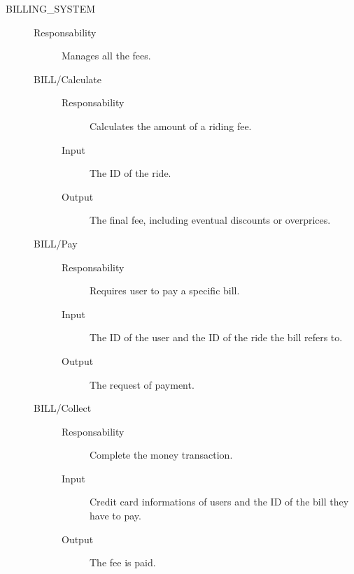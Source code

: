 \documentclass[11pt]{article} %
\begin{document}
\begin{description}
	\item[BILLING\_SYSTEM] \hfill
	\begin{description}
		\item[Responsability] Manages all the fees.
	\item[BILL/Calculate] \hfill
		\begin{description}
			\item[Responsability] Calculates the amount of a riding fee.
			\item[Input] The ID of the ride.
			\item[Output] The final fee, including eventual discounts or overprices.
		\end{description}
	\item[BILL/Pay] \hfill
		\begin{description}
			\item[Responsability] Requires user to pay a specific bill.
			\item[Input] The ID of the user and the ID of the ride the bill refers to.
			\item[Output] The request of payment.
		\end{description}
	\item[BILL/Collect] \hfill
		\begin{description}
			\item[Responsability] Complete the money transaction.
			\item[Input] Credit card informations of users and the ID of the bill they have to pay.
			\item[Output] The fee is paid.
		\end{description}
	\end{description}


\end{description}
\end{document}
